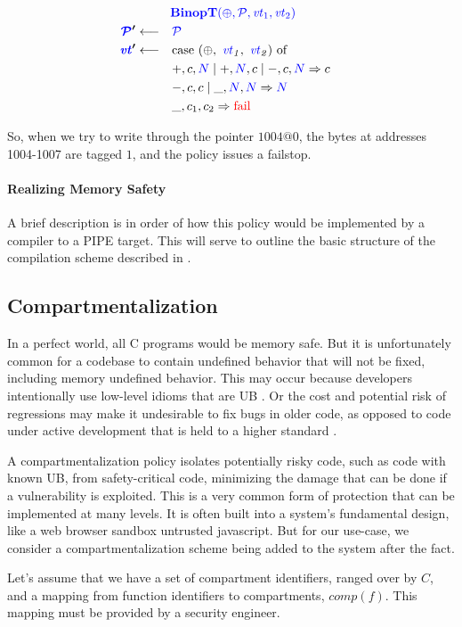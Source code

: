 \documentclass[acmsmall,review,anonymous]{acmart}\settopmatter{printfolios=true,printccs=false,printacmref=false}
\begin{document}
\[\begin{aligned}
\truledef{\binopt}
\settag{\PCT'}{\PCT}
\settag{\vt'}{\caseof{(\oplus,~ \vt_1,~ \vt_2)}}
\caseentry{+, c, \N \mid +, \N, c \mid -, c, \N}{c} \\
\caseentry{-, c, c \mid \_, \N, \N}{\N} \\
\caseentry{\_, c_1, c_2}{\textnormal{\color{red} fail}} \\
\end{aligned}\]

So, when we try to write through the pointer \(1004@0\), the bytes at addresses 1004-1007 are
tagged \(1\), and the policy issues a failstop.

\paragraph*{Realizing Memory Safety}

A brief description is in order of how this policy would be implemented by a compiler to a PIPE
target. This will serve to outline the basic structure of the compilation scheme described in
\cite{Chhak21:Tagine}.

\subsection{Compartmentalization}
\label{sec:comp}
In a perfect world, all C programs would be memory safe. But it is unfortunately common
for a codebase to contain undefined behavior that will not be fixed, including memory undefined
behavior. This may occur because developers intentionally use low-level idioms that are UB
\cite{DeFacto}.
Or the cost and potential risk of regressions may make it undesirable to fix bugs in older code,
as opposed to code under active development that is held to a higher standard \cite{Bessey10:Coverity}.

A compartmentalization policy isolates potentially risky code, such as code with known UB,
from safety-critical code, minimizing the damage that can be done if a vulnerability is exploited.
This is a very common form of protection that can be implemented at many levels. It is often built
into a system's fundamental design, like a web browser sandbox untrusted javascript.
But for our use-case, we consider a compartmentalization scheme being added to the system
after the fact.

Let's assume that we have a set of compartment identifiers, ranged over by \(C\), and a mapping
from function identifiers to compartments, \(\mathit{comp}(f)\). This mapping must be provided by
a security engineer.
\end{document}
